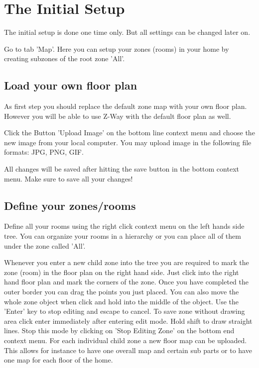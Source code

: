 \section{The Initial Setup} 

The initial setup is done one time only. But all settings can be changed later on.

Go to tab 'Map'. Here you can setup your zones (rooms) in your home by creating 
subzones of the root zone 'All'.  

\subsection{Load your own floor plan}

As first step you should replace the default zone map with your own floor plan. However you will be able to 
use Z-Way with the default floor plan as well.

Click the Button 'Upload Image' on the bottom line context menu and choose the new image from your local 
computer. You may upload image in the following file formats: JPG, PNG, GIF.

All changes will be saved after hitting the save button in the bottom context menu. Make sure to save 
all your changes!

\subsection{Define your zones/rooms}

Define all your rooms using the right click context menu on the left hands side tree. You can organize 
your rooms in a hierarchy or you can place all of them under the zone called 'All'.

Whenever you enter a new child zone into the tree you are required to mark the zone (room) in the floor 
plan on the right hand side. Just click into the right hand floor plan and mark the corners of the zone. 
Once you have completed the outer border you can drag the points you just placed. You can also move the 
whole zone object when click 
and hold into the middle of the object. Use the 'Enter' key to stop editing and escape to cancel. To save 
zone without drawing area click enter 
immediately after entering edit mode. Hold shift to draw straight lines. Stop this mode by clicking on 
'Stop Editing Zone' on the bottom end context menu.  For each individual child zone a new floor map can 
be uploaded. This allows for instance to have one 
overall map and certain sub parts or to have one map for each floor of the home.

